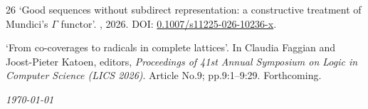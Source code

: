 \documentclass[a4paper]{article}
\begin{document}
\begin{flushleft}
\begin{thebibliography}{26}
\newblock `Good sequences without subdirect representation: a constructive treatment of Mundici's $\Gamma$ functor'.
, 2026.
\newblock DOI: \href{https://doi.org/10.1007/s11225-026-10236-x}{0.1007/s11225-026-10236-x}.

\newblock `From co-coverages to radicals in complete lattices'.
\newblock In Claudia Faggian and Joost-Pieter Katoen, editors, {\em Proceedings of 41st Annual Symposium on Logic in Computer Science (LICS 2026)}.
\newblock Article No.9; pp.9:1–9:29. Forthcoming.


\end{thebibliography}


\end{flushleft}


 \vfill \hfill \emph{\today}

%
%
%
%
\end{document}
